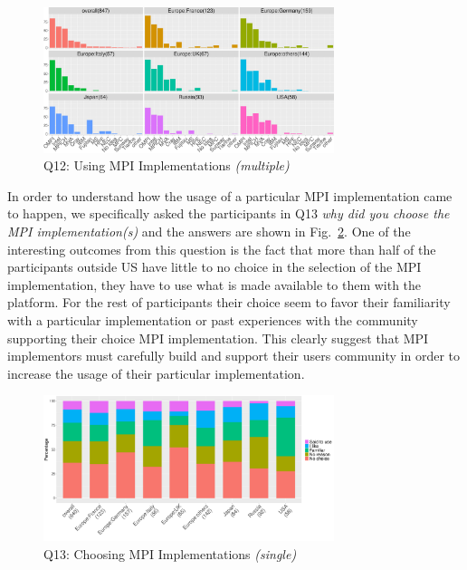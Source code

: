 \documentclass[preprint,5p,times]{elsarticle}
\def\myquote#1{{\it #1}}
\begin{document}
  \begin{figure}[htb]
    \begin{center}
      \includegraphics[width=8.5cm]{R-scripts/Q12.pdf}
      \caption{Q12: Using MPI Implementations {\it(multiple)}}
      \label{fig:using-implementations}
    \end{center}
  \end{figure}

In order to understand how the usage of a particular MPI implementation came to
happen, we specifically asked the participants in Q13 \myquote{why did you
choose the MPI implementation(s)} and the answers are shown in
Fig.~\ref{fig:choosing-implementation}.
%
One of the interesting outcomes from this question is the fact that more than
half of the participants outside US have little to no choice in the selection of
the MPI implementation, they have to use what is made available to them with the
platform. For the rest of participants their choice seem to favor their
familiarity with a particular implementation or past experiences with the
community supporting their choice MPI implementation.
%
This clearly suggest that MPI implementors must carefully build and support
their users community in order to increase the usage of their particular
implementation.


  \begin{figure}[htb]
    \begin{center}
      \includegraphics[width=8.5cm]{R-scripts/Q13.pdf}
      \caption{Q13: Choosing MPI Implementations {\it(single)}}
      \label{fig:choosing-implementation}
    \end{center}
  \end{figure}
\end{document}
